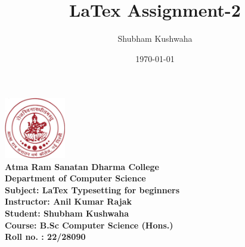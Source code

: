 \documentclass[12pt]{article}
\title{LaTex Assignment-2}
\author{Shubham Kushwaha}
\date{\today}
\begin{document}
\begin{center}
  \includegraphics[width=0.2\textwidth]{Questions/pictures/logoc.jpg}\\[1cm] 
  
  \textbf{\LARGE Atma Ram Sanatan Dharma College}\\[0.2cm]
  \textbf{\Large Department of Computer Science}\\[1cm]
  \textbf{\Large Subject: LaTex Typesetting for beginners}\\[0.5cm]
  \textbf{\Large Instructor: Anil Kumar Rajak}\\[0.5cm]
  \textbf{\Large Student: Shubham Kushwaha}\\[0.5cm]
  \textbf{\Large Course: B.Sc Computer Science (Hons.)}\\[0.5cm]
  \textbf{\Large Roll no. : 22/28090}\\[1cm]
  
  
\end{center}

\maketitle







\end{document}
